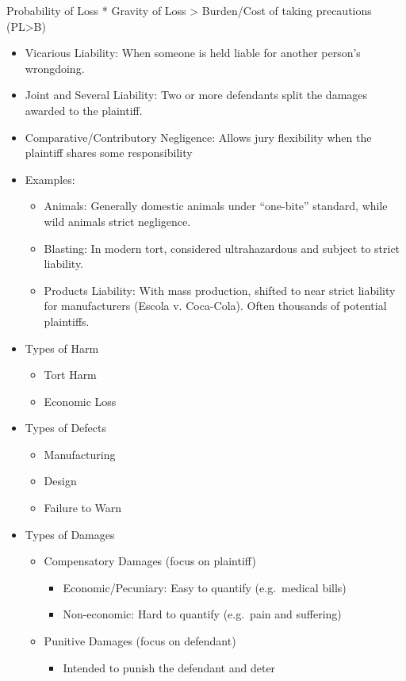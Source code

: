 \documentclass[
]{article}
\providecommand{\tightlist}{%
  \setlength{\itemsep}{0pt}\setlength{\parskip}{0pt}}
\begin{document}
Probability of Loss * Gravity of Loss \textgreater{} Burden/Cost of
taking precautions (PL\textgreater B)

\begin{itemize}
\item
  Vicarious Liability: When someone is held liable for another person's
  wrongdoing.
\item
  Joint and Several Liability: Two or more defendants split the damages
  awarded to the plaintiff.
\item
  Comparative/Contributory Negligence: Allows jury flexibility when the
  plaintiff shares some responsibility
\item
  Examples:

  \begin{itemize}
  \item
    Animals: Generally domestic animals under ``one-bite'' standard,
    while wild animals strict negligence.
  \item
    Blasting: In modern tort, considered ultrahazardous and subject to
    strict liability.
  \item
    Products Liability: With mass production, shifted to near strict
    liability for manufacturers (Escola v. Coca-Cola). Often thousands
    of potential plaintiffs.
  \end{itemize}
\item
  Types of Harm

  \begin{itemize}
  \item
    Tort Harm
  \item
    Economic Loss
  \end{itemize}
\item
  Types of Defects

  \begin{itemize}
  \item
    Manufacturing
  \item
    Design
  \item
    Failure to Warn
  \end{itemize}
\item
  Types of Damages

  \begin{itemize}
  \item
    Compensatory Damages (focus on plaintiff)

    \begin{itemize}
    \item
      Economic/Pecuniary: Easy to quantify (e.g.~medical bills)
    \item
      Non-economic: Hard to quantify (e.g.~pain and suffering)
    \end{itemize}
  \item
    Punitive Damages (focus on defendant)

    \begin{itemize}
    \tightlist
    \item
      Intended to punish the defendant and deter
    \end{itemize}
  \end{itemize}
\end{itemize}
\end{document}
